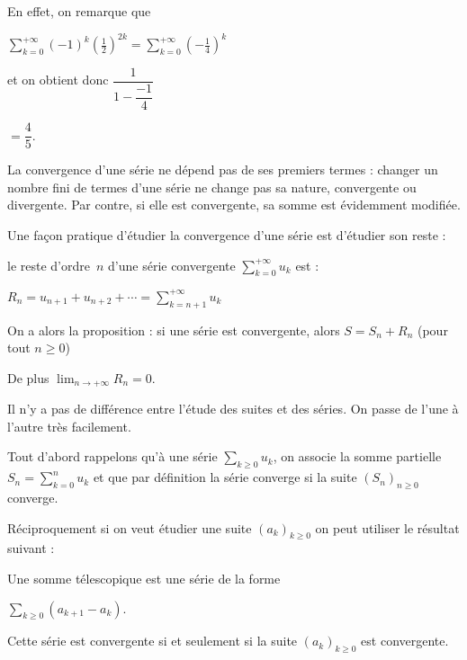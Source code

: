 \change
En effet, on remarque que 

$\displaystyle \sum_{k=0} ^{+\infty} (-1)^k \left(\frac{1}{2}\right)^{2k} =\sum_{k=0} ^{+\infty} \left(-\frac{1}{4}\right)^k$

\change
et on obtient donc $\dfrac{1}{1-\dfrac{-1}{4}}$

\change
$=\dfrac{4}{5}.$
 


\diapo

La convergence d'une série ne dépend pas de ses premiers termes : changer un nombre fini de termes d'une série ne change pas sa nature, convergente ou divergente. Par contre, si elle est convergente, sa somme est évidemment modifiée.

Une façon pratique d'étudier la convergence d'une série est d'étudier son reste :

\change
le reste d'ordre~$n$ d'une série convergente $\sum_{k = 0}^{+\infty} u_k$ est :

$R_n = u_{n+1}+u_{n+2}+\cdots = \sum_{k=n+1}^{+\infty} u_k$

\change
On a alors la proposition : si une série est convergente, alors 
$S=S_n+R_n$ (pour tout $n\ge0$) 

\change
De plus $\lim_{n\to+\infty} R_n=0$.

%
%


\diapo

Il n'y a pas de différence entre l'étude des suites et des séries. 
On passe de l'une à l'autre très facilement.

Tout d'abord rappelons qu'à une série $\sum_{k \ge 0} u_k$, on associe 
la somme partielle $S_n=\sum_{k=0}^n u_k$ et que par définition
la série converge si la suite $(S_n)_{n\ge0}$ converge.

\change
Réciproquement si on veut étudier une suite $(a_k)_{k\ge0}$ on peut utiliser le résultat suivant :

\change
Une somme télescopique est une série de la forme

$\sum_{k\ge0} (a_{k+1}-a_k).$

\change
Cette série est convergente si et seulement si la suite $(a_k)_{k\ge0}$ est convergente.

